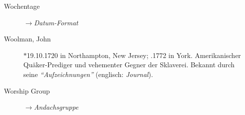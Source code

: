 \begin{description}
\item[Wochentage] $\to$\textit{Datum-Format}

\item[Woolman, John] $\ast$19.10.1720 in Northampton, New Jersey; .1772 in York. Amerikanischer Quäker-Prediger und vehementer Gegner der Sklaverei. Bekannt durch seine \textit{"`Aufzeichnungen"'} (englisch: \textit{Journal}).

\item[Worship Group] $\to$\textit{Andachsgruppe}

 \end{description}


\normalsize